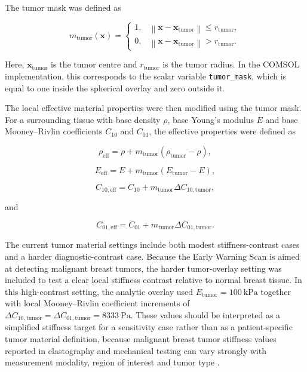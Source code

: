 The tumor mask was defined as

\begin{equation}
m_{\mathrm{tumor}}(\mathbf{x})
=
\begin{cases}
1, & \left\|\mathbf{x}-\mathbf{x}_{\mathrm{tumor}}\right\| \leq r_{\mathrm{tumor}}, \\
0, & \left\|\mathbf{x}-\mathbf{x}_{\mathrm{tumor}}\right\| > r_{\mathrm{tumor}}.
\end{cases}
\label{tumor_spherical_material_overlay_mask}
\end{equation}

Here, $\mathbf{x}_{\mathrm{tumor}}$ is the tumor centre and $r_{\mathrm{tumor}}$ is the tumor radius. In the COMSOL implementation, this corresponds to the scalar variable \texttt{tumor\_mask}, which is equal to one inside the spherical overlay and zero outside it.

The local effective material properties were then modified using the tumor mask. For a surrounding tissue with base density $\rho$, base Young's modulus $E$ and base Mooney--Rivlin coefficients $C_{10}$ and $C_{01}$, the effective properties were defined as

\begin{equation}
\rho_{\mathrm{eff}}
=
\rho
+
m_{\mathrm{tumor}}\left(\rho_{\mathrm{tumor}}-\rho\right),
\label{tumor_effective_density}
\end{equation}

\begin{equation}
E_{\mathrm{eff}}
=
E
+
m_{\mathrm{tumor}}\left(E_{\mathrm{tumor}}-E\right),
\label{tumor_effective_youngs_modulus}
\end{equation}

\begin{equation}
C_{10,\mathrm{eff}}
=
C_{10}
+
m_{\mathrm{tumor}}\Delta C_{10,\mathrm{tumor}},
\label{tumor_effective_c10_coefficient}
\end{equation}

and

\begin{equation}
C_{01,\mathrm{eff}}
=
C_{01}
+
m_{\mathrm{tumor}}\Delta C_{01,\mathrm{tumor}}.
\label{tumor_effective_c01_coefficient}
\end{equation}

The current tumor material settings include both modest stiffness-contrast cases and a harder diagnostic-contrast case. Because the Early Warning Scan is aimed at detecting malignant breast tumors, the harder tumor-overlay setting was included to test a clear local stiffness contrast relative to normal breast tissue. In this high-contrast setting, the analytic overlay used $E_{\mathrm{tumor}}=100~\mathrm{kPa}$ together with local Mooney--Rivlin coefficient increments of $\Delta C_{10,\mathrm{tumor}}=\Delta C_{01,\mathrm{tumor}}=8333~\mathrm{Pa}$. These values should be interpreted as a simplified stiffness target for a sensitivity case rather than as a patient-specific tumor material definition, because malignant breast tumor stiffness values reported in elastography and mechanical testing can vary strongly with measurement modality, region of interest and tumor type \cite{Samani2007,McKnight2002,Patel2021,Patel2022}.

